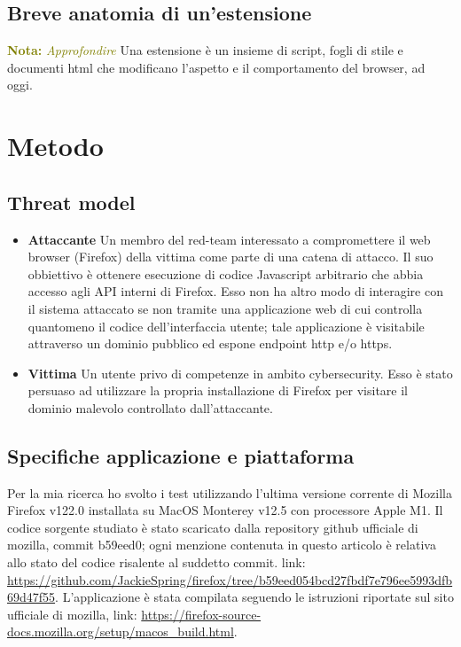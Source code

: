 \documentclass[]{sapthesis}
\newcommand{\MComment}[3]{\textcolor{#3}{ \textbf{#1} \textit{#2}}}
\newcommand{\Nota}[1]{\MComment{Nota:}{#1}{olive}}
\begin{document}
    \section{Breve anatomia di un'estensione}
        \Nota{Approfondire}
        Una estensione è un insieme di script, fogli di stile e documenti html che modificano
        l'aspetto e il comportamento del browser, ad oggi.

\newpage

\chapter{Metodo}
    \section{Threat model}
        \begin{itemize}
            \item \textbf{Attaccante} Un membro del red-team interessato a compromettere
                il web browser (Firefox) della vittima come parte di una catena di attacco.
                Il suo obbiettivo è ottenere esecuzione di codice Javascript arbitrario che abbia
                accesso agli API interni di Firefox.
                Esso non ha altro modo di interagire con il sistema attaccato se non tramite
                una applicazione web di cui controlla quantomeno il codice dell'interfaccia utente;
                tale applicazione è visitabile attraverso un dominio pubblico ed espone endpoint
                http e/o https.

            \item \textbf{Vittima} Un utente privo di competenze in ambito cybersecurity.
                Esso è stato persuaso ad utilizzare la propria installazione di Firefox
                per visitare il dominio malevolo controllato dall'attaccante.
        \end{itemize}

    \section{Specifiche applicazione e piattaforma}
        Per la mia ricerca ho svolto i test utilizzando l'ultima versione corrente di
        Mozilla Firefox v122.0 installata su MacOS Monterey v12.5 con processore Apple M1.
        Il codice sorgente studiato è stato scaricato dalla repository github ufficiale di mozilla,
        commit b59eed0; ogni menzione contenuta in questo articolo è relativa allo stato del codice
        risalente al suddetto commit. link: \url{https://github.com/JackieSpring/firefox/tree/b59eed054bcd27fbdf7e796ee5993dfb69d47f55}. 
        L'applicazione è stata compilata seguendo le istruzioni riportate sul sito
        ufficiale di mozilla, link: \url{https://firefox-source-docs.mozilla.org/setup/macos_build.html}.
\end{document}
